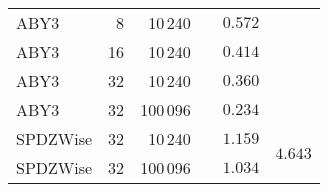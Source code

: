 \documentclass[a4paper,11pt,
]{article}
\newcommand{\cmark}{\ding{51}}%
\newcommand{\xmark}{\ding{55}}%
\begin{document}
\begin{table}[ht]
\begin{tabular}{lrrcrr}
        ABY3                         & 8                           & 10\,240                        & \xmark                        & $0.572$                     &                          \\
        ABY3                         & 16                          & 10\,240                        & \xmark                        & $0.414$                     &                          \\
        ABY3                         & 32                          & 10\,240                        & \xmark                        & $0.360$                     &                          \\
        ABY3                         & 32                          & 100\,096                       & \xmark                        & $0.234$                     &                          \\
        \midrule
        SPDZWise                     & 32                          & 10\,240                        & \cmark                        & $1.159$                     & \multirow{2}{*}{$4.643$} \\
        SPDZWise                     & 32                          & 100\,096                       & \cmark                        & $1.034$                     &                          \\
        \bottomrule
    \end{tabular}
\end{table}
\end{document}
